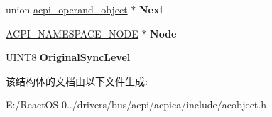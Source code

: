 \begin{DoxyCompactItemize}
union \hyperlink{unionacpi__operand__object}{acpi\+\_\+operand\+\_\+object} $\ast$ {\bfseries Next}
\item 
\mbox{\label{structacpi__object__mutex_a9b6c69b591d9d9e2c1b00e5ab067ef70}} 
\hyperlink{structacpi__namespace__node}{A\+C\+P\+I\+\_\+\+N\+A\+M\+E\+S\+P\+A\+C\+E\+\_\+\+N\+O\+DE} $\ast$ {\bfseries Node}
\item 
\mbox{\label{structacpi__object__mutex_ac88fee4f3bdcb72c3e01280580c9db99}} 
\hyperlink{_processor_bind_8h_ab27e9918b538ce9d8ca692479b375b6a}{U\+I\+N\+T8} {\bfseries Original\+Sync\+Level}
\end{DoxyCompactItemize}


该结构体的文档由以下文件生成\+:\begin{DoxyCompactItemize}
\item 
E\+:/\+React\+O\+S-\/0../drivers/bus/acpi/acpica/include/acobject.\+h\end{DoxyCompactItemize}
